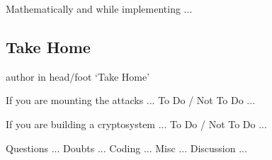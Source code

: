 \documentclass[9pt]{beamer}
\begin{document}
\begin{frame}
Mathematically and while implementing ...

\end{frame}

\subsection{Take Home}
\begin{frame}
\begin{beamercolorbox}[ht=2.5ex,dp=1.125ex,center,rounded=true,shadow=true]{author in head/foot}
`Take Home'
\end{beamercolorbox}
\end{frame}

\begin{frame}
If you are mounting the attacks ... To Do / Not To Do ...

\end{frame}

\begin{frame}
If you are building a cryptosystem ... To Do / Not To Do ...

\end{frame}

\begin{frame}
Questions ... Doubts ... Coding ... Misc ... Discussion ...

\end{frame}
\end{document}
